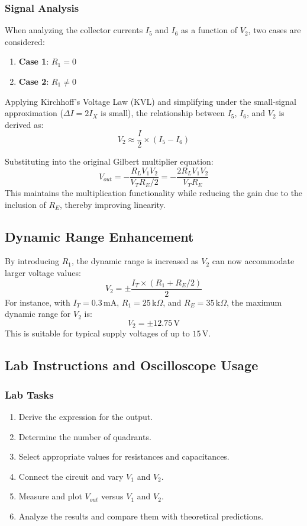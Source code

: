 \subsubsection{Signal Analysis}

When analyzing the collector currents $I_5$ and $I_6$ as a function of $V_2$, two cases are considered:
\begin{enumerate}
    \item \textbf{Case 1}: $R_1 = 0$
    \item \textbf{Case 2}: $R_1 \neq 0$
\end{enumerate}

Applying Kirchhoff's Voltage Law (KVL) and simplifying under the small-signal approximation ($\Delta I = 2I_X$ is small), the relationship between $I_5$, $I_6$, and $V_2$ is derived as:
\[
V_2 \approx \frac{I}{2} \times (I_5 - I_6)
\]

Substituting into the original Gilbert multiplier equation:
\[
V_{out} = -\frac{R_L V_1 V_2}{V_T R_E/2} = -\frac{2R_L V_1 V_2}{V_T R_E}
\]
This maintains the multiplication functionality while reducing the gain due to the inclusion of $R_E$, thereby improving linearity.

\subsection{Dynamic Range Enhancement}

By introducing $R_1$, the dynamic range is increased as $V_2$ can now accommodate larger voltage values:
\[
V_2 = \pm \frac{I_T \times (R_1 + R_E/2)}{2}
\]
For instance, with $I_T = 0.3\,\text{mA}$, $R_1 = 25\,\text{k}\Omega$, and $R_E = 35\,\text{k}\Omega$, the maximum dynamic range for $V_2$ is:
\[
V_2 = \pm 12.75\,\text{V}
\]
This is suitable for typical supply voltages of up to $15\,\text{V}$.

\subsection{Lab Instructions and Oscilloscope Usage}

\subsubsection{Lab Tasks}
\begin{enumerate}
    \item Derive the expression for the output.
    \item Determine the number of quadrants.
    \item Select appropriate values for resistances and capacitances.
    \item Connect the circuit and vary $V_1$ and $V_2$.
    \item Measure and plot $V_{out}$ versus $V_1$ and $V_2$.
    \item Analyze the results and compare them with theoretical predictions.
\end{enumerate}

